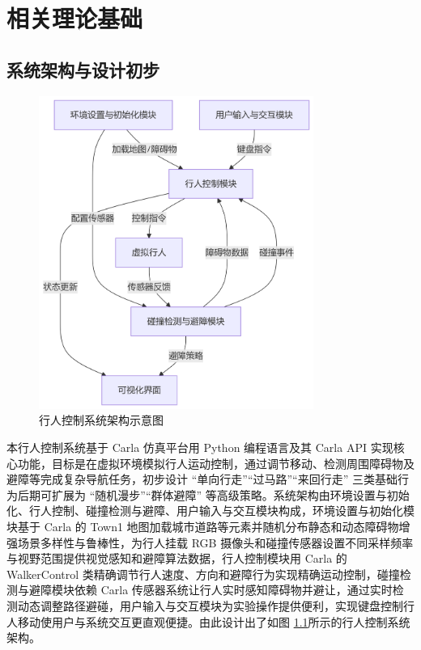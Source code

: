 \chapter{相关理论基础}

\section{系统架构与设计初步}

\begin{figure}[H]
    \centering
    \includegraphics[width=0.8\textwidth]{images/system_architecture.png}
    \caption{行人控制系统架构示意图}
    \label{fig:system_architecture}
\end{figure}

本行人控制系统基于 Carla 仿真平台用 Python 编程语言及其 Carla API 实现核心功能，目标是在虚拟环境模拟行人运动控制，通过调节移动、检测周围障碍物及避障等完成复杂导航任务，初步设计 “单向行走”“过马路”“来回行走” 三类基础行为后期可扩展为 “随机漫步”“群体避障” 等高级策略。系统架构由环境设置与初始化、行人控制、碰撞检测与避障、用户输入与交互模块构成，环境设置与初始化模块基于 Carla 的 Town1 地图加载城市道路等元素并随机分布静态和动态障碍物增强场景多样性与鲁棒性，为行人挂载 RGB 摄像头和碰撞传感器设置不同采样频率与视野范围提供视觉感知和避障算法数据，行人控制模块用 Carla 的 WalkerControl 类精确调节行人速度、方向和避障行为实现精确运动控制，碰撞检测与避障模块依赖 Carla 传感器系统让行人实时感知障碍物并避让，通过实时检测动态调整路径避碰，用户输入与交互模块为实验操作提供便利，实现键盘控制行人移动使用户与系统交互更直观便捷。由此设计出了如图 \ref{fig:system_architecture}所示的行人控制系统架构。

